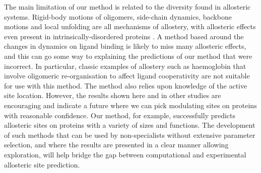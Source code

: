 The main limitation of our method is related to the diversity found in allosteric systems.
Rigid-body motions of oligomers, side-chain dynamics, backbone motions and local unfolding are all mechanisms of allostery, with allosteric effects even present in intrinsically-disordered proteins \cite{Motlagh2014}.
A method based around the changes in dynamics on ligand binding is likely to miss many allosteric effects, and this can go some way to explaining the predictions of our method that were incorrect.
In particular, classic examples of allostery such as haemoglobin that involve oligomeric re-organisation to affect ligand cooperativity are not suitable for use with this method.
The method also relies upon knowledge of the active site location.
However, the results shown here and in other studies are encouraging and indicate a future where we can pick modulating sites on proteins with reasonable confidence.
Our method, for example, successfully predicts allosteric sites on proteins with a variety of sizes and functions.
The development of such methods that can be used by non-specialists without extensive parameter selection, and where the results are presented in a clear manner allowing exploration, will help bridge the gap between computational and experimental allosteric site prediction.
